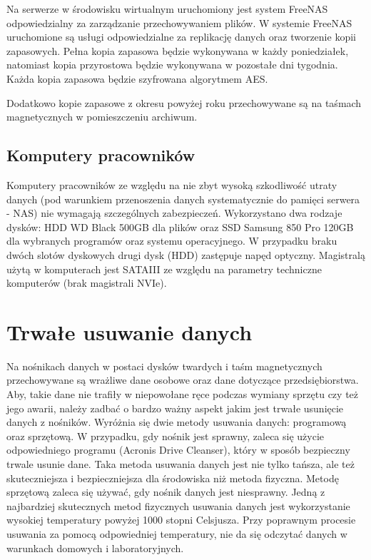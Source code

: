 Na serwerze w środowisku wirtualnym uruchomiony jest system FreeNAS odpowiedzialny za zarządzanie przechowywaniem plików. W systemie FreeNAS uruchomione są usługi odpowiedzialne za replikację danych oraz tworzenie kopii zapasowych. Pełna kopia zapasowa będzie wykonywana w każdy poniedziałek, natomiast kopia przyrostowa będzie wykonywana w pozostałe dni tygodnia. Każda kopia zapasowa będzie szyfrowana algorytmem AES.

Dodatkowo kopie zapasowe z okresu powyżej roku przechowywane są na taśmach magnetycznych w pomieszczeniu archiwum.

\subsection{Komputery pracowników}
Komputery pracowników ze względu na nie zbyt wysoką szkodliwość utraty danych (pod warunkiem przenoszenia danych systematycznie do pamięci serwera - NAS) nie wymagają szczególnych zabezpieczeń. Wykorzystano dwa rodzaje dysków: HDD WD Black 500GB dla plików oraz SSD Samsung 850 Pro 120GB dla wybranych programów oraz systemu operacyjnego. W przypadku braku dwóch slotów dyskowych drugi dysk (HDD) zastępuje napęd optyczny. Magistralą użytą w komputerach jest SATAIII ze względu na parametry techniczne komputerów (brak magistrali NVIe).


\section{Trwałe usuwanie danych}
Na nośnikach danych w postaci dysków twardych i taśm magnetycznych przechowywane są wrażliwe dane osobowe oraz dane dotyczące przedsiębiorstwa. Aby, takie dane nie trafiły w niepowołane ręce podczas wymiany sprzętu czy też jego awarii, należy zadbać o bardzo ważny aspekt jakim jest trwałe usunięcie danych z nośników. Wyróżnia się dwie metody usuwania danych: programową oraz sprzętową. W przypadku, gdy nośnik jest sprawny, zaleca się użycie odpowiedniego programu (Acronis Drive Cleanser), który w sposób bezpieczny trwale usunie dane. Taka metoda usuwania danych jest nie tylko tańsza, ale też skuteczniejsza i bezpieczniejsza dla środowiska niż metoda fizyczna. Metodę sprzętową zaleca się używać, gdy nośnik danych jest niesprawny. Jedną z najbardziej skutecznych metod fizycznych usuwania danych jest wykorzystanie wysokiej temperatury powyżej 1000 stopni Celsjusza. Przy poprawnym procesie usuwania za pomocą odpowiedniej temperatury, nie da się odczytać danych w warunkach domowych i laboratoryjnych.
